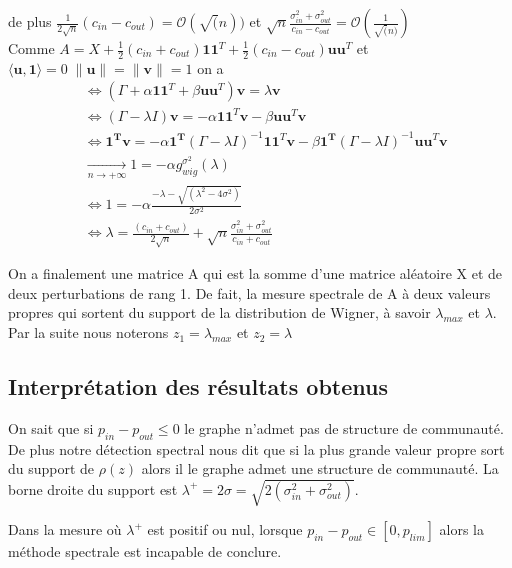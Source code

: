 de plus $\frac{1}{2\sqrt{n}}(c_{in} - c_{out}) = \mathcal{O}(\sqrt(n))$ et $\sqrt{n}\frac{\sigma_{in}^2 + \sigma_{out}^2}{c_{in} - c_{out}} =  \mathcal{O}(\frac{1}{\sqrt(n)})$\\
 
Comme $A = X + \frac{1}{2}(c_{in} + c_{out})\mathbf{11}^T + \frac{1}{2}(c_{in} - c_{out})\mathbf{uu}^T$ et $\langle\mathbf{u}, \mathbf{1}\rangle = 0 \; \|\mathbf{u}\|=\|\mathbf{v}\|=1$ on a
\begin{align}
	&\Leftrightarrow (\Gamma + \alpha\mathbf{11}^T + \beta \mathbf{uu}^T)\mathbf{v} = \lambda \mathbf{v}\nonumber\\
	&\Leftrightarrow (\Gamma - \lambda I)\mathbf{v} = -\alpha\mathbf{11}^T\mathbf{v} - \beta \mathbf{uu}^T\mathbf{v} \nonumber\\
	&\Leftrightarrow \mathbf{1^Tv} = -\alpha\mathbf{1^T} (\Gamma - \lambda I)^{-1}\mathbf{11}^T\mathbf{v} - \beta \mathbf{1^T} (\Gamma - \lambda I)^{-1}\mathbf{uu}^T\mathbf{v} \nonumber\\
	&\xrightarrow[n \to +\infty]{} 1 = -\alpha g_{wig}^{\sigma^2}(\lambda) \nonumber\\
	&\Leftrightarrow 1 = -\alpha  \frac{- \lambda - \sqrt{(\lambda^2 - 4\sigma^2)}}{2\sigma^2}\nonumber\\
	&\Leftrightarrow \lambda = \frac{(c_{in} + c_{out})}{2\sqrt{n}} + \sqrt{n}\frac{\sigma_{in}^2 + \sigma_{out}^2}{c_{in} + c_{out}} \label{z_2}
\end{align} 

On a finalement une matrice A qui est la somme d'une matrice aléatoire X et de deux perturbations de rang 1.
De fait, la mesure spectrale de A à deux valeurs propres qui sortent du support de la distribution de Wigner, à savoir $\lambda_{max}$ et $\lambda$.
Par la suite nous noterons $z_1 = \lambda_{max}$ et $z_2 = \lambda$

\subsection{Interprétation des résultats obtenus}
\label{subsec:1.3}
On sait que si $p_{in} - p_{out} \le 0$  le graphe n'admet pas de structure de communauté.
De plus notre détection spectral nous dit que si la plus grande valeur propre sort du support de $\rho(z)$ alors il le graphe admet une structure de communauté.
La borne droite du support est $\lambda^+ = 2\sigma = \sqrt{2(\sigma_{in}^2 + \sigma_{out}^2)}$.

Dans la mesure où  $\lambda^+$ est positif ou nul, lorsque $p_{in} - p_{out} \in [0, p_{lim}]$ alors la méthode spectrale est incapable de conclure.\\
 
